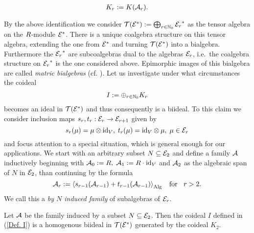 \documentclass[twoside,12pt]{article}
\begin{document}
\begin{eqnarray} \label{homogene Koideale}
K_r:=K({\cal A}_r).
\end{eqnarray}

By the above identification we consider ${\cal T}({{\cal E}}^*):=\bigoplus_{r \in
{\mathbb N}_0}{{\cal E}_r}^*$ as the tensor algebra on the $R$-module ${{\cal E}}^*$.
There is a unique coalgebra structure on this tensor algebra, extending
the one from ${{\cal E}}^*$ and turning ${\cal T}({{\cal E}}^*)$ into a bialgebra.
Furthermore the ${{\cal E}_r}^*$ are subcoalgebras dual to the algebras
${\cal E}_r$, i.e.\ the coalgebra structure on ${{\cal E}_r}^*$ is the one considered
above.
Epimorphic images of this bialgebra are called {\em matric bialgebras}
(cf. \cite{tak2}).
Let us investigate under what circumstances the coideal
\begin{eqnarray} \label{Def. I}
I:=\oplus_{r \in {\mathbb N}_0 } K_r
\end{eqnarray}
becomes an ideal in ${\cal T}({{\cal E}}^*)$ and thus consequently is a
biideal. To this claim we consider inclusion maps
$s_{r},t_{r}:{\cal E}_r \rightarrow {\cal E}_{r+1}$ given by
\[
s_{r}(\mu )=\mu \otimes {\rm id}_{V}, \; t_{r}(\mu )={\rm id}_{V}\otimes \mu ,\; \mu 
\in {\cal E}_r \]
and focus attention to a special situation, which is general enough
for our applications.  We start with an arbitrary subset
$N\subseteq {\cal E}_{2}$ and define a family ${\cal A}$ inductively beginning with
${\cal A}_{0}:=R,\; {\cal A}_{1}:=R\cdot{\rm id}_{V}$ and ${\cal A}_{2}$ as the
algebraic span of $N$ in ${\cal E}_{2}$, than continuing by the formula
\[ {\cal A}_r:=\left<s_{r-1}({\cal A}_{r-1}) +
t_{r-1}({\cal A}_{r-1})\right>_{\rm Alg} \;\;\mbox{ for } \;\;r>2.\] 
We call this a {\em by $N$ induced family} of subalgebras of ${\cal E}_r$.

\begin{prop} \label{Biideal}
Let ${\cal A}$ be the family induced by a subset $N\subseteq
{\cal E}_{2}$. Then the coideal $I$ defined in (\ref{Def. I}) is a
homogenous biideal in ${\cal T}({{\cal E}}^*)$ generated by the coideal $K_2$.
\end{prop}
\end{document}
